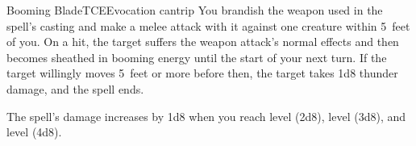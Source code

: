 \begin{spell}{Booming Blade}{TCE}{Evocation cantrip}
{
}
You brandish the weapon used in the spell's casting and
make a melee attack with it against one creature within
5~feet of you. On a hit, the target suffers the weapon
attack's normal effects and then becomes sheathed in
booming energy until the start of your next turn. If the
target willingly moves 5~feet or more before then, the
target takes 1d8 thunder damage, and the spell ends.

 The spell's damage increases by
1d8 when you reach  level (2d8),  level (3d8),
and  level (4d8).
\end{spell}

